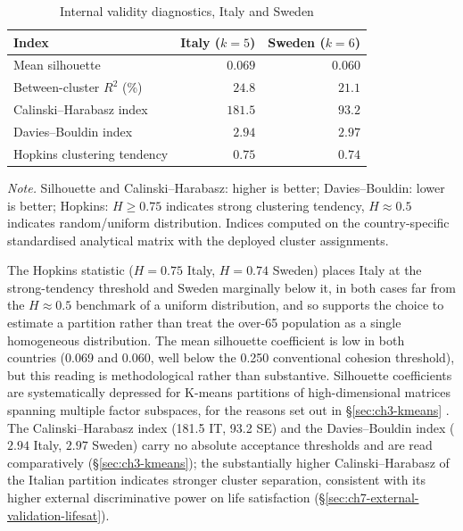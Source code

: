 \begin{table}[!htbp]
  \centering
  \small
  \caption[Internal validity diagnostics, Italy and Sweden]{Internal validity diagnostics, Italy and Sweden}
  \label{tab:ch7-internal-validity}
  \renewcommand{\arraystretch}{1.2}
  \setlength{\tabcolsep}{6pt}
  \begin{tabular}{@{}lrr@{}}
    \toprule
    \textbf{Index} & \textbf{Italy ($k = 5$)} & \textbf{Sweden ($k = 6$)} \\
    \midrule
    Mean silhouette                       & $0.069$  & $0.060$ \\
    Between-cluster $R^2$ (\%)            & $24.8$   & $21.1$ \\
    Calinski--Harabasz index              & $181.5$  & $93.2$ \\
    Davies--Bouldin index                 & $2.94$   & $2.97$ \\
    Hopkins clustering tendency           & $0.75$   & $0.74$ \\
    \bottomrule
  \end{tabular}
  \par\medskip
  \begin{minipage}{\linewidth}
    \footnotesize\textit{Note.} Silhouette and Calinski--Harabasz: higher is better; Davies--Bouldin: lower is better; Hopkins: $H \geq 0.75$ indicates strong clustering tendency, $H \approx 0.5$ indicates random/uniform distribution. Indices computed on the country-specific standardised analytical matrix with the deployed cluster assignments.
  \end{minipage}
\end{table}

The Hopkins statistic ($H = 0.75$ Italy, $H = 0.74$ Sweden) places Italy at the strong-tendency threshold and Sweden marginally below it, in both cases far from the $H \approx 0.5$ benchmark of a uniform distribution, and so supports the choice to estimate a partition rather than treat the over-65 population as a single homogeneous distribution. The mean silhouette coefficient is low in both countries (0.069 and 0.060, well below the 0.250 conventional cohesion threshold), but this reading is methodological rather than substantive. Silhouette coefficients are systematically depressed for K-means partitions of high-dimensional matrices spanning multiple factor subspaces, for the reasons set out in \S\ref{sec:ch3-kmeans} \citep{steinley2006}. The Calinski--Harabasz index (181.5 IT, 93.2 SE) and the Davies--Bouldin index ($2.94$ Italy, $2.97$ Sweden) carry no absolute acceptance thresholds and are read comparatively (\S\ref{sec:ch3-kmeans}); the substantially higher Calinski--Harabasz of the Italian partition indicates stronger cluster separation, consistent with its higher external discriminative power on life satisfaction (\S\ref{sec:ch7-external-validation-lifesat}).

